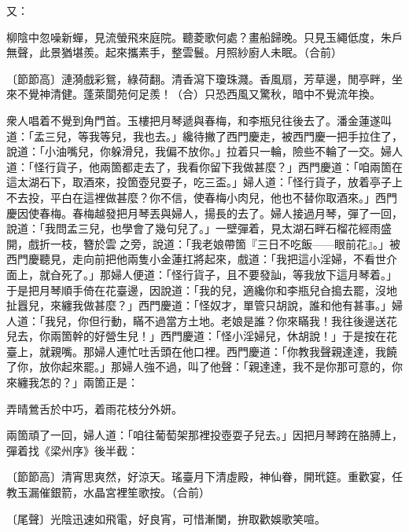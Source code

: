 又：

\begin{myquote} 
柳陰中忽噪新蟬，見流螢飛來庭院。聽菱歌何處？畫船歸晚。只見玉繩低度，朱戶無聲，此景猶堪羨。起來攜素手，整雲鬟。月照紗廚人未眠。{\markfont\small{（合前）}}

{\markfont\small{〔節節高〕}}漣漪戲彩鴛，綠荷翻。清香瀉下瓊珠濺。香風扇，芳草邊，閒亭畔，坐來不覺神清健。蓬萊閬苑何足羨！{\markfont\small{（合）}}只恐西風又驚秋，暗中不覺流年換。
\end{myquote} 

衆人唱着不覺到角門首。玉樓把月琴遞與春梅，和李瓶兒往後去了。{}潘金蓮遂叫道：「孟三兒，等我等兒，我也去。」纔待撇了西門慶走，被西門慶一把手拉住了，說道：「小油嘴兒，你躲滑兒，我偏不放你。」拉着只一輪，險些不輪了一交。{}婦人道：「怪行貨子，他兩箇都走去了，我看你留下我做甚麼？」西門慶道：「咱兩箇在這太湖石下，取酒來，投箇壺兒耍子，吃三盃。」婦人道：「怪行貨子，放着亭子上不去投，平白在這裡做甚麼？你不信，使春梅小肉兒，他也不替你取酒來。」西門慶因使春梅。春梅越發把月琴丟與婦人，揚長的去了。{}婦人接過月琴，彈了一回，說道：「我問孟三兒，也學會了幾句兒了。」一壁彈着，見太湖石畔石榴花經雨盛開，戲折一枝，簪於雲𩬆之旁，{}說道：「我老娘帶箇『三日不吃飯——眼前花』。」{}被西門慶聽見，走向前把他兩隻小金蓮扛將起來，戲道：「我把這小淫婦，不看世介面上，就㒲死了。」{}那婦人便道：「怪行貨子，且不要發訕，等我放下這月琴着。」{}于是把月琴順手倚在花臺邊，因說道：「我的兒，適纔你和李瓶兒㒲搗去罷，沒地扯囂兒，來纏我做甚麼？」西門慶道：「怪奴才，單管只胡說，誰和他有甚事。」婦人道：「我兒，你但行動，瞞不過當方土地。老娘是誰？你來瞞我！我往後邊送花兒去，你兩箇幹的好營生兒！」西門慶道：「怪小淫婦兒，休胡說！」于是按在花臺上，就親嘴。那婦人連忙吐舌頭在他口裡。西門慶道：「你教我聲親達達，我饒了你，放你起來罷。」那婦人強不過，叫了他聲：「親達達，我不是你那可意的，你來纏我怎的？」{}兩箇正是：

\begin{myquote} 
弄晴鶯舌於中巧，着雨花枝分外妍。
\end{myquote} 

兩箇頑了一回，婦人道：「咱往葡萄架那裡投壺耍子兒去。」因把月琴跨在胳膊上，{}彈着找《梁州序》後半截：{}

\begin{myquote}
{\markfont\small{〔節節高〕}}清宵思爽然，好涼天。瑤臺月下清虛殿，神仙眷，開玳筵。重歡宴，任教玉漏催銀箭，水晶宮裡笙歌按。{\markfont\small{（合前）}}

{\markfont\small{〔尾聲〕}}光陰迅速如飛電，好良宵，可惜漸闌，拚取歡娛歌笑喧。
\end{myquote}

